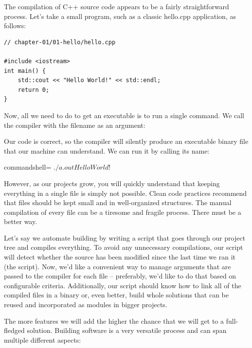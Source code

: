 
The compilation of C++ source code appears to be a fairly straightforward process. Let's take a small program, such as a classic hello.cpp application, as follows:

\begin{lstlisting}[style=styleCXX]
// chapter-01/01-hello/hello.cpp

#include <iostream>
int main() {
	std::cout << "Hello World!" << std::endl;
	return 0;
}
\end{lstlisting}

Now, all we need to do to get an executable is to run a single command. We call the compiler with the filename as an argument:


Our code is correct, so the compiler will silently produce an executable binary file that our machine can understand. We can run it by calling its name:

\begin{tcblisting}{commandshell={}}
$ ./a.out
Hello World!
$
\end{tcblisting}

However, as our projects grow, you will quickly understand that keeping everything in a single file is simply not possible. Clean code practices recommend that files should be kept small and in well-organized structures. The manual compilation of every file can be a tiresome and fragile process. There must be a better way.


Let's say we automate building by writing a script that goes through our project tree and compiles everything. To avoid any unnecessary compilations, our script will detect whether the source has been modified since the last time we ran it (the script). Now, we'd like a convenient way to manage arguments that are passed to the compiler for each file – preferably, we'd like to do that based on configurable criteria. Additionally, our script should know how to link all of the compiled files in a binary or, even better, build whole solutions that can be reused and incorporated as modules in bigger projects.

The more features we will add the higher the chance that we will get to a full-fledged solution. Building software is a very versatile process and can span multiple different aspects:

